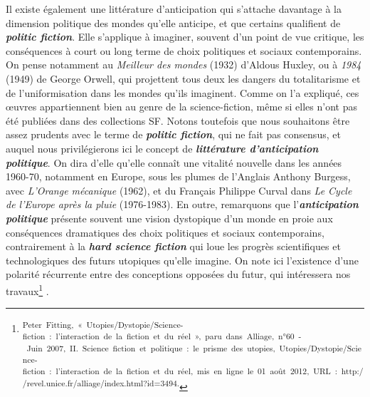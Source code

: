 \documentclass[letterpaper,portrait,12pt]{article}
\begin{document}
	Il existe \'{e}galement une litt\'{e}rature d'anticipation qui s'attache davantage \`{a} la dimension politique des mondes qu'elle anticipe, et que certains qualifient de \textbf{\emph{politic fiction}}. Elle s'applique \`{a} imaginer, souvent d'un point de vue critique, les cons\'{e}quences \`{a} court ou long terme de choix politiques et sociaux contemporains. On pense notamment au \emph{Meilleur des mondes} (1932) d'Aldous Huxley, ou \`{a} \emph{1984} (1949) de George Orwell, qui projettent tous deux les dangers du totalitarisme et de l'uniformisation dans les mondes qu'ils imaginent. Comme on l'a expliqu\'{e}, ces \oe{}uvres appartiennent bien au genre de la science-fiction, m\^{e}me si elles n'ont pas \'{e}t\'{e} publi\'{e}es dans des collections SF. Notons toutefois que nous souhaitons \^{e}tre assez prudents avec le terme de \textbf{\emph{politic fiction}}, qui ne fait pas consensus, et auquel nous privil\'{e}gierons ici le concept de \textbf{\emph{litt\'{e}rature d'anticipation politique}}. On dira d'elle qu'elle conna\^{i}t une vitalit\'{e} nouvelle dans les ann\'{e}es 1960-70, notamment en Europe, sous les plumes de l'Anglais Anthony Burgess, avec \emph{L'Orange m\'{e}canique} (1962), et du Fran\c{c}ais Philippe Curval dans \emph{Le Cycle de l'Europe apr\`{e}s la pluie} (1976-1983). En outre, remarquons que l'\textbf{\emph{anticipation politique }}pr\'{e}sente souvent une vision dystopique d'un monde en proie aux cons\'{e}quences dramatiques des choix politiques et sociaux contemporains, contrairement \`{a} la \textbf{\emph{hard science fiction}} qui loue les progr\`{e}s scientifiques et technologiques des futurs utopiques qu'elle imagine. On note ici l'existence d'une polarit\'{e} r\'{e}currente entre des conceptions oppos\'{e}es du futur, qui int\'{e}ressera nos travaux\footnote{\textsuperscript{\newpage
}\textsuperscript{	Peter\ Fitting,\ «\ Utopies/Dystopie/Science-fiction\ :\ l'interaction\ de\ la\ fiction\ et\ du\ r\'{e}el\ »,\ paru\ dans\ Alliage,\ n°60\ -\ Juin\ 2007,\ II.\ Science\ fiction\ et\ politique\ :\ le\ prisme\ des\ utopies,\ Utopies/Dystopie/Science-fiction\ :\ l'interaction\ de\ la\ fiction\ et\ du\ r\'{e}el,\ mis\ en\ ligne\ le\ 01\ ao\^{u}t\ 2012,\ URL\ :\ http://revel.unice.fr/alliage/index.html?id=3494.}} .
\end{document}
